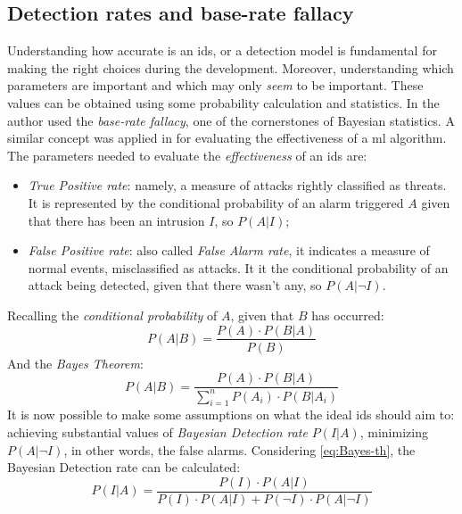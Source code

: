 
\subsection{Detection rates and base-rate fallacy}
\label{subsec:detection-rates}

Understanding how accurate is an \gls{ids}, or a detection model is fundamental for making the right choices during the development. Moreover, understanding which parameters are important and which may only \textit{seem} to be important. These values can be obtained using some probability calculation and statistics. In \cite{Axelsson2000} the author used the \textit{base-rate fallacy}, one of the cornerstones of Bayesian statistics. A similar concept was applied in \cite{Liu2019} for evaluating the effectiveness of a \gls{ml} algorithm. The parameters needed to evaluate the \textit{effectiveness} of an \gls{ids} are:
\begin{itemize}
    \item[\faCaretRight] \textit{True Positive rate}: namely, a measure of attacks rightly classified as threats. It is represented by the conditional probability of an alarm triggered $A$ given that there has been an intrusion $I$, so $P(A|I)$;
    \item[\faCaretRight] \textit{False Positive rate}: also called \textit{False Alarm rate}, it indicates a measure of normal events, misclassified as attacks. It it the conditional probability of an attack being detected, given that there wasn't any, so $P(A|\neg I)$.
\end{itemize}
Recalling the \textit{conditional probability} of $A$, given that $B$ has occurred:
\begin{equation}
    P(A|B)=\frac{P(A)\cdot P(B|A)}{P(B)}
    \label{eq:conditional-prob}
\end{equation}
And the \textit{Bayes Theorem}:
\begin{equation}
    P(A|B)=\frac{P(A)\cdot P(B|A)}{\sum_{i=1}^nP(A_i)\cdot P(B|A_i)}
    \label{eq:Bayes-th}
\end{equation}
It is now possible to make some assumptions on what the ideal \gls{ids} should aim to: achieving substantial values of \textit{Bayesian Detection rate} $P(I|A)$, minimizing $P(A|\neg I)$, in other words, the false alarms. Considering \ref{eq:Bayes-th}, the Bayesian Detection rate can be calculated:
\begin{equation}
    P(I|A)=\frac{P(I)\cdot P(A|I)}{P(I)\cdot P(A|I)+ P(\neg I)\cdot P(A|\neg I)}
    \label{eq:Bayesian-detection-rate}
\end{equation}
